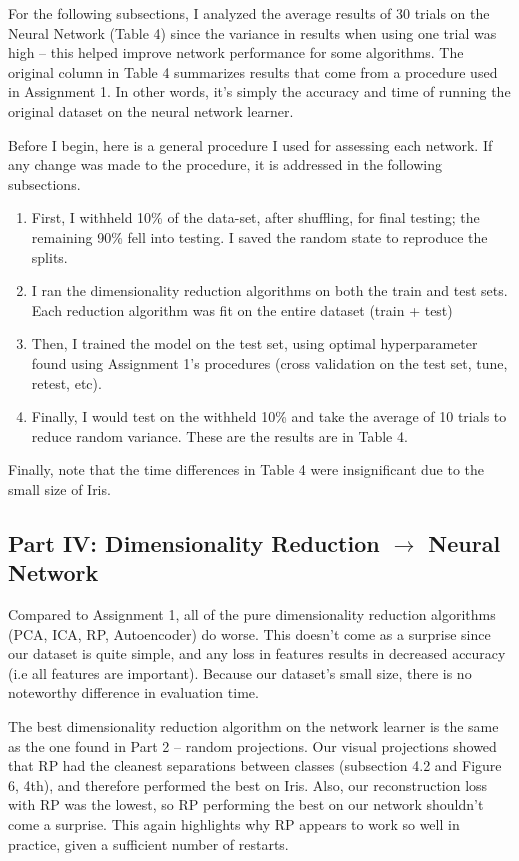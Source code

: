 \documentclass[letter]{article}
\begin{document}
For the following subsections, I analyzed the average results of 30 trials on the Neural Network (Table 4) since the variance in results when using one trial was high -- this helped improve network performance for some algorithms. The original column in Table 4 summarizes results that come from a procedure used in Assignment 1. In other words, it's simply the accuracy and time of running the original dataset on the neural network learner.

Before I begin, here is a general procedure I used for assessing each network. If any change was made to the procedure, it is addressed in the following subsections.

\begin{enumerate}
  \item First, I withheld 10\% of the data-set, after shuffling, for final testing; the remaining 90\% fell into testing. I saved the random state to reproduce the splits.
  \item I ran the dimensionality reduction algorithms on both the train and test sets. Each reduction algorithm was fit on the entire dataset (train + test)
  \item Then, I trained the model on the test set, using optimal hyperparameter found using Assignment 1's procedures (cross validation on the test set, tune, retest, etc). 
  \item Finally, I would test on the withheld 10\% and take the average of 10 trials to reduce random variance. These are the results are in Table 4. 
\end{enumerate}

Finally, note that the time differences in Table 4 were insignificant due to the small size of Iris.

\subsection{Part IV: Dimensionality Reduction $\rightarrow$ Neural Network}
Compared to Assignment 1, all of the pure dimensionality reduction algorithms (PCA, ICA, RP, Autoencoder) do worse. This doesn't come as a surprise since our dataset is quite simple, and any loss in features results in decreased accuracy (i.e all features are important). Because our dataset's small size, there is no noteworthy difference in evaluation time.

The best dimensionality reduction algorithm on the network learner is the same as the one found in Part 2 -- random projections. Our visual projections showed that RP had the cleanest separations between classes (subsection 4.2 and Figure 6, 4th), and therefore performed the best on Iris. Also, our reconstruction loss with RP was the lowest, so RP performing the best on our network shouldn't come a surprise. This again highlights why RP appears to work so well in practice, given a sufficient number of restarts.
\end{document}
